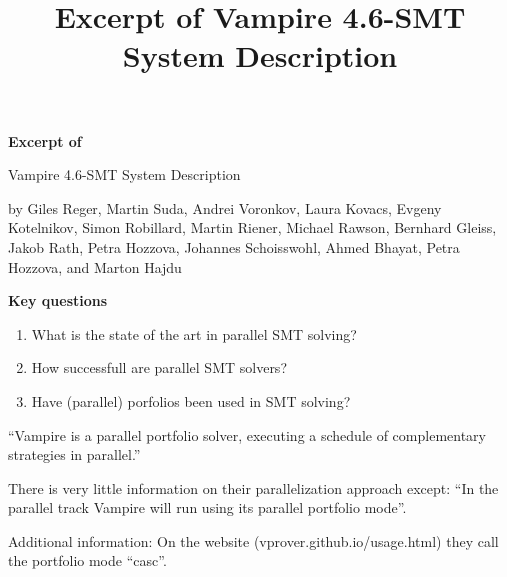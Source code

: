\documentclass{scrartcl}
\title{Excerpt of Vampire 4.6-SMT System Description}
\begin{document}
\begin{center}
    \Large{\textbf{Excerpt of}}

    \LARGE{Vampire 4.6-SMT System Description}

    \large{by Giles Reger, Martin Suda, Andrei Voronkov, Laura Kovacs,
        Evgeny Kotelnikov, Simon Robillard, Martin Riener, Michael Rawson,
        Bernhard Gleiss, Jakob Rath, Petra Hozzova, Johannes Schoisswohl,
        Ahmed Bhayat, Petra Hozzova, and Marton Hajdu
    }
\end{center}

\vspace{1cm}

\begin{addmargin}[0.2\linewidth]{0.2\linewidth}
    \begin{center}
        \textbf{Key questions}
    \end{center}
    \begin{enumerate}[i]
        \item What is the state of the art in parallel SMT solving?
        \item How successfull are parallel SMT solvers?
        \item Have (parallel) porfolios been used in SMT solving?
    \end{enumerate}
\end{addmargin}

\vspace{1cm}

\enquote{Vampire is a parallel portfolio solver, executing a schedule of complementary
strategies in parallel.}

There is very little information on their parallelization approach except:
\enquote{In the parallel track Vampire will run using its parallel portfolio mode}.

Additional information:
On the website (vprover.github.io/usage.html) they call the portfolio mode \enquote{casc}.
\end{document}
